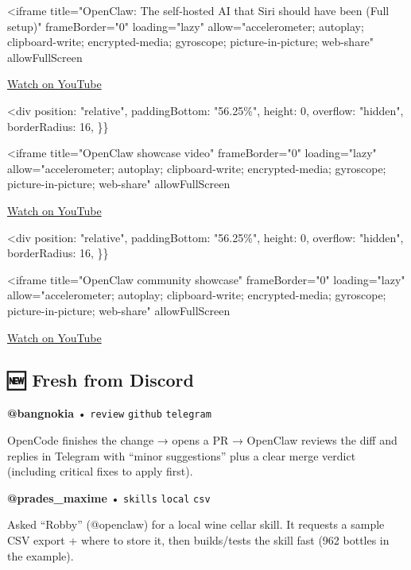 <iframe
title="OpenClaw: The self-hosted AI that Siri should have been (Full setup)"
frameBorder="0"
loading="lazy"
allow="accelerometer; autoplay; clipboard-write; encrypted-media; gyroscope; picture-in-picture; web-share"
allowFullScreen

\href{https://www.youtube.com/watch?v=SaWSPZoPX34}{Watch on YouTube}

<div
position: "relative",
paddingBottom: "56.25\%",
height: 0,
overflow: "hidden",
borderRadius: 16,
\}\}
\begin{quote}

\end{quote}

<iframe
title="OpenClaw showcase video"
frameBorder="0"
loading="lazy"
allow="accelerometer; autoplay; clipboard-write; encrypted-media; gyroscope; picture-in-picture; web-share"
allowFullScreen

\href{https://www.youtube.com/watch?v=mMSKQvlmFuQ}{Watch on YouTube}

<div
position: "relative",
paddingBottom: "56.25\%",
height: 0,
overflow: "hidden",
borderRadius: 16,
\}\}
\begin{quote}

\end{quote}

<iframe
title="OpenClaw community showcase"
frameBorder="0"
loading="lazy"
allow="accelerometer; autoplay; clipboard-write; encrypted-media; gyroscope; picture-in-picture; web-share"
allowFullScreen

\href{https://www.youtube.com/watch?v=5kkIJNUGFho}{Watch on YouTube}

\subsection{🆕 Fresh from Discord}



\textbf{@bangnokia} • \texttt{review} \texttt{github} \texttt{telegram}

OpenCode finishes the change → opens a PR → OpenClaw reviews the diff and replies in Telegram with “minor suggestions” plus a clear merge verdict (including critical fixes to apply first).


\textbf{@prades\_maxime} • \texttt{skills} \texttt{local} \texttt{csv}

Asked “Robby” (@openclaw) for a local wine cellar skill. It requests a sample CSV export + where to store it, then builds/tests the skill fast (962 bottles in the example).


